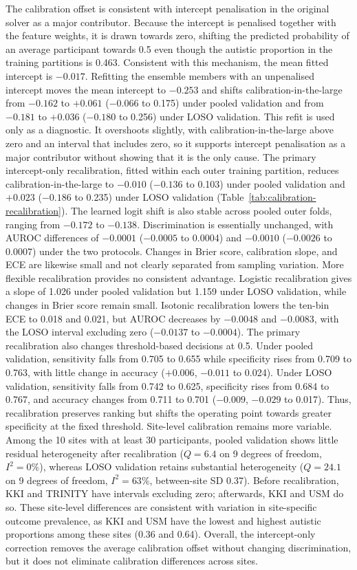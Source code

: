 The calibration offset is consistent with intercept penalisation in the original solver as a major contributor. Because the intercept is penalised together with the feature weights, it is drawn towards zero, shifting the predicted probability of an average participant towards 0.5 even though the autistic proportion in the training partitions is 0.463. Consistent with this mechanism, the mean fitted intercept is $-0.017$. Refitting the ensemble members with an unpenalised intercept moves the mean intercept to $-0.253$ and shifts calibration-in-the-large from $-0.162$ to $+0.061$ ($-0.066$ to 0.175) under pooled validation and from $-0.181$ to $+0.036$ ($-0.180$ to 0.256) under LOSO validation. This refit is used only as a diagnostic. It overshoots slightly, with calibration-in-the-large above zero and an interval that includes zero, so it supports intercept penalisation as a major contributor without showing that it is the only cause. The primary intercept-only recalibration, fitted within each outer training partition, reduces calibration-in-the-large to $-0.010$ ($-0.136$ to 0.103) under pooled validation and $+0.023$ ($-0.186$ to 0.235) under LOSO validation (Table~\ref{tab:calibration-recalibration}). The learned logit shift is also stable across pooled outer folds, ranging from $-0.172$ to $-0.138$. Discrimination is essentially unchanged, with AUROC differences of $-0.0001$ ($-0.0005$ to 0.0004) and $-0.0010$ ($-0.0026$ to 0.0007) under the two protocols. Changes in Brier score, calibration slope, and ECE are likewise small and not clearly separated from sampling variation. More flexible recalibration provides no consistent advantage. Logistic recalibration gives a slope of 1.026 under pooled validation but 1.159 under LOSO validation, while changes in Brier score remain small. Isotonic recalibration lowers the ten-bin ECE to 0.018 and 0.021, but AUROC decreases by $-0.0048$ and $-0.0083$, with the LOSO interval excluding zero ($-0.0137$ to $-0.0004$). The primary recalibration also changes threshold-based decisions at 0.5. Under pooled validation, sensitivity falls from 0.705 to 0.655 while specificity rises from 0.709 to 0.763, with little change in accuracy ($+0.006$, $-0.011$ to 0.024). Under LOSO validation, sensitivity falls from 0.742 to 0.625, specificity rises from 0.684 to 0.767, and accuracy changes from 0.711 to 0.701 ($-0.009$, $-0.029$ to 0.017). Thus, recalibration preserves ranking but shifts the operating point towards greater specificity at the fixed threshold. Site-level calibration remains more variable. Among the 10 sites with at least 30 participants, pooled validation shows little residual heterogeneity after recalibration ($Q=6.4$ on 9 degrees of freedom, $I^2=0\%$), whereas LOSO validation retains substantial heterogeneity ($Q=24.1$ on 9 degrees of freedom, $I^2=63\%$, between-site SD 0.37). Before recalibration, KKI and TRINITY have intervals excluding zero; afterwards, KKI and USM do so. These site-level differences are consistent with variation in site-specific outcome prevalence, as KKI and USM have the lowest and highest autistic proportions among these sites (0.36 and 0.64). Overall, the intercept-only correction removes the average calibration offset without changing discrimination, but it does not eliminate calibration differences across sites.

